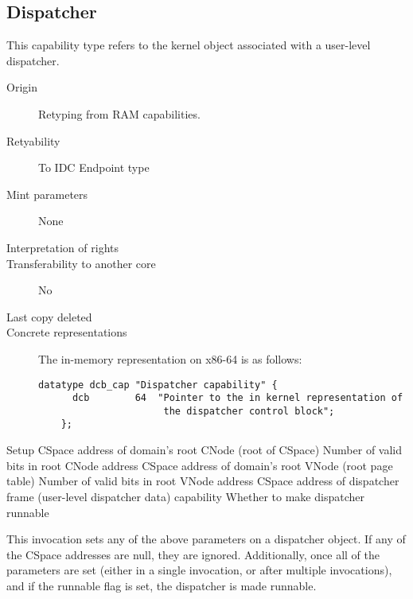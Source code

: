 \subsection{Dispatcher}
This capability type refers to the kernel object associated with a
user-level dispatcher.

\begin{description}
\item[Origin] Retyping from RAM capabilities.
  
\item[Retyability] To IDC Endpoint type
  
\item[Mint parameters] None
  
\item[Interpretation of rights] 
  
\item[Transferability to another core] No

\item[Last copy deleted] 
  
\item[Concrete representations] The in-memory representation on x86-64
  is as follows:
  
  \begin{lstlisting}[language=Mackerel]
    datatype dcb_cap "Dispatcher capability" {
      dcb        64  "Pointer to the in kernel representation of
                      the dispatcher control block";
    };
  \end{lstlisting}
\end{description}

\begin{invocation}{Setup}
  \arg CSpace address of domain's root CNode (root of CSpace)
  \arg Number of valid bits in root CNode address
  \arg CSpace address of domain's root VNode (root page table)
  \arg Number of valid bits in root VNode address
  \arg CSpace address of dispatcher frame (user-level dispatcher
  data) capability
  \arg Whether to make dispatcher runnable
\end{invocation}
This invocation sets any of the above parameters on a dispatcher
object.  If any of the CSpace addresses are null, they are ignored.
Additionally, once all of the parameters are set (either in a single
invocation, or after multiple invocations), and if the runnable flag
is set, the dispatcher is made runnable.  

